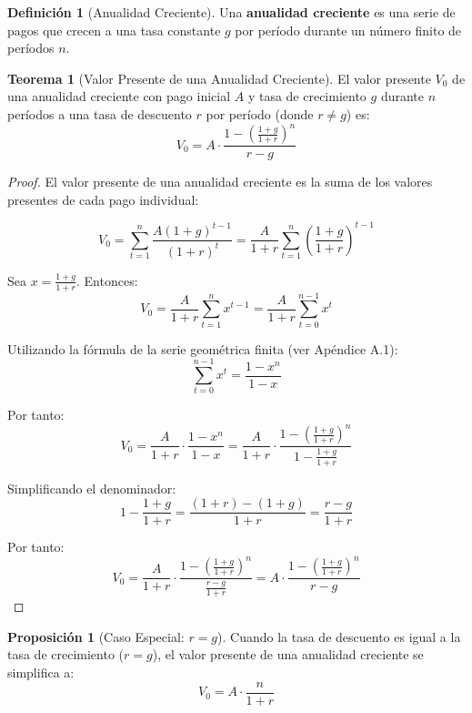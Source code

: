 \documentclass[12pt,a4paper]{article}
\theoremstyle{definition}
\newtheorem{definicion}{Definición}[section]
\newtheorem{teorema}{Teorema}[section]
\newtheorem{proposicion}{Proposición}[section]
\begin{document}
\begin{definicion}[Anualidad Creciente]
Una \textbf{anualidad creciente} es una serie de pagos que crecen a una tasa constante $g$ por período durante un número finito de períodos $n$.
\end{definicion}

\begin{teorema}[Valor Presente de una Anualidad Creciente]
El valor presente $V_0$ de una anualidad creciente con pago inicial $A$ y tasa de crecimiento $g$ durante $n$ períodos a una tasa de descuento $r$ por período (donde $r \neq g$) es:
\begin{equation}
V_0 = A \cdot \frac{1 - \left(\frac{1 + g}{1 + r}\right)^n}{r - g}
\end{equation}
\end{teorema}

\begin{proof}
El valor presente de una anualidad creciente es la suma de los valores presentes de cada pago individual:

$$V_0 = \sum_{t=1}^{n} \frac{A(1 + g)^{t-1}}{(1 + r)^t} = \frac{A}{1 + r} \sum_{t=1}^{n} \left(\frac{1 + g}{1 + r}\right)^{t-1}$$

Sea $x = \frac{1 + g}{1 + r}$. Entonces:
$$V_0 = \frac{A}{1 + r} \sum_{t=1}^{n} x^{t-1} = \frac{A}{1 + r} \sum_{t=0}^{n-1} x^t$$

Utilizando la fórmula de la serie geométrica finita (ver Apéndice A.1):
$$\sum_{t=0}^{n-1} x^t = \frac{1 - x^n}{1 - x}$$

Por tanto:
$$V_0 = \frac{A}{1 + r} \cdot \frac{1 - x^n}{1 - x} = \frac{A}{1 + r} \cdot \frac{1 - \left(\frac{1 + g}{1 + r}\right)^n}{1 - \frac{1 + g}{1 + r}}$$

Simplificando el denominador:
$$1 - \frac{1 + g}{1 + r} = \frac{(1 + r) - (1 + g)}{1 + r} = \frac{r - g}{1 + r}$$

Por tanto:
$$V_0 = \frac{A}{1 + r} \cdot \frac{1 - \left(\frac{1 + g}{1 + r}\right)^n}{\frac{r - g}{1 + r}} = A \cdot \frac{1 - \left(\frac{1 + g}{1 + r}\right)^n}{r - g}$$
\end{proof}

\begin{proposicion}[Caso Especial: $r = g$]
Cuando la tasa de descuento es igual a la tasa de crecimiento ($r = g$), el valor presente de una anualidad creciente se simplifica a:
\begin{equation}
V_0 = A \cdot \frac{n}{1 + r}
\end{equation}
\end{proposicion}
\end{document}
